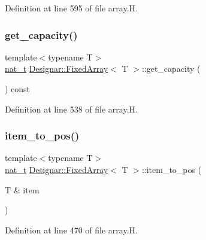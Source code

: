 Definition at line 595 of file array.\+H.

\mbox{\label{class_designar_1_1_fixed_array_ac262a6be77640c4da26cd49fe9b90db0}} 
\subsubsection{\texorpdfstring{get\+\_\+capacity()}{get\_capacity()}}
{\footnotesize\ttfamily template$<$typename T$>$ \\
\hyperlink{namespace_designar_aa72662848b9f4815e7bf31a7cf3e33d1}{nat\+\_\+t} \hyperlink{class_designar_1_1_fixed_array}{Designar\+::\+Fixed\+Array}$<$ T $>$\+::get\+\_\+capacity (\begin{DoxyParamCaption}{ }\end{DoxyParamCaption}) const\hspace{0.3cm}{\ttfamily [inline]}}



Definition at line 538 of file array.\+H.

\mbox{\label{class_designar_1_1_fixed_array_af1c7e826a704015eab8f3accac7ead7d}} 
\subsubsection{\texorpdfstring{item\+\_\+to\+\_\+pos()}{item\_to\_pos()}}
{\footnotesize\ttfamily template$<$typename T$>$ \\
\hyperlink{namespace_designar_aa72662848b9f4815e7bf31a7cf3e33d1}{nat\+\_\+t} \hyperlink{class_designar_1_1_fixed_array}{Designar\+::\+Fixed\+Array}$<$ T $>$\+::item\+\_\+to\+\_\+pos (\begin{DoxyParamCaption}\item[{T \&}]{item }\end{DoxyParamCaption})\hspace{0.3cm}{\ttfamily [inline]}}



Definition at line 470 of file array.\+H.

